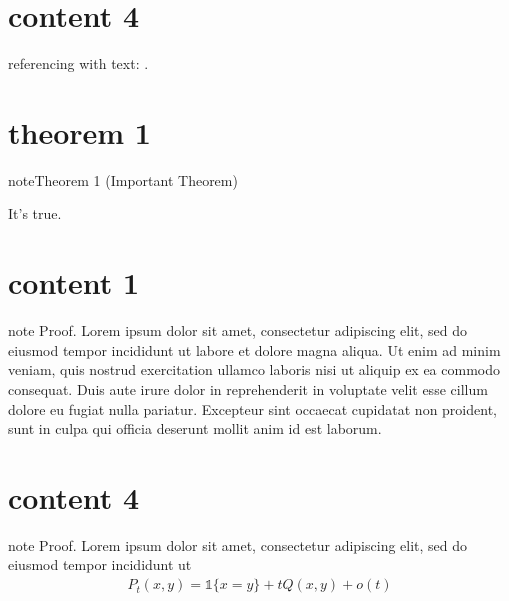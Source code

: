 \chapter{content 4}
\label{\detokenize{algorithm/_algo_text_reference:content-4}}\label{\detokenize{algorithm/_algo_text_reference::doc}}
\sphinxAtStartPar
referencing with text: {\hyperref[\detokenize{algorithm/_algo_labeled_titled_with_classname:test-algo-label}]{}}.


\chapter{theorem 1}
\label{\detokenize{theorem/_theorems_with_number:theorem-1}}\label{\detokenize{theorem/_theorems_with_number::doc}}\label{theorem/_theorems_with_number:theorem-one}
\begin{sphinxadmonition}{note}{Theorem 1 (Important Theorem)}



\sphinxAtStartPar
It’s true.
\end{sphinxadmonition}


\chapter{content 1}
\label{\detokenize{proof/_proof_with_classname:content-1}}\label{\detokenize{proof/_proof_with_classname::doc}}
\begin{sphinxadmonition}{note}
\sphinxAtStartPar
Proof. Lorem ipsum dolor sit amet, consectetur adipiscing elit, sed do eiusmod tempor incididunt ut labore et dolore magna aliqua. Ut enim ad minim veniam, quis nostrud exercitation ullamco laboris nisi ut aliquip ex ea commodo consequat. Duis aute irure dolor in reprehenderit in voluptate velit esse cillum dolore eu fugiat nulla pariatur. Excepteur sint occaecat cupidatat non proident, sunt in culpa qui officia deserunt mollit anim id est laborum.
\end{sphinxadmonition}


\chapter{content 4}
\label{\detokenize{proof/_proof_with_labeled_math:content-4}}\label{\detokenize{proof/_proof_with_labeled_math::doc}}
\begin{sphinxadmonition}{note}
\sphinxAtStartPar
Proof. Lorem ipsum dolor sit amet, consectetur adipiscing elit, sed do eiusmod tempor incididunt ut
\begin{equation}\label{equation:proof/_proof_with_labeled_math:label1}
\begin{split}P_t(x, y) = \mathbb 1\{x = y\} + t Q(x, y) + o(t)\end{split}
\end{equation}\end{sphinxadmonition}


